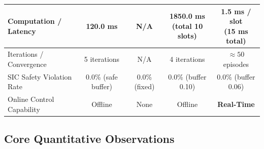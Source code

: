 \begin{table}[htbp]
{\begin{tabular}{|l|c|c|c|c|}
\hline
Computation / Latency & 120.0 ms & N/A & \makecell{1850.0 ms\\(total 10 slots)} & \makecell{\textbf{1.5 ms / slot}\\(15 ms total)} \\
\hline
Iterations / Convergence & 5 iterations & N/A & 4 iterations & $\approx 50$ episodes \\
\hline
SIC Safety Violation Rate & 0.0\% (safe buffer) & 0.0\% (fixed) & 0.0\% (buffer 0.10) & 0.0\% (buffer 0.06) \\
\hline
Online Control Capability & Offline & None & Offline & \textbf{Real-Time} \\
\hline
\end{tabular}%
}
\end{table}

\subsection*{Core Quantitative Observations}

